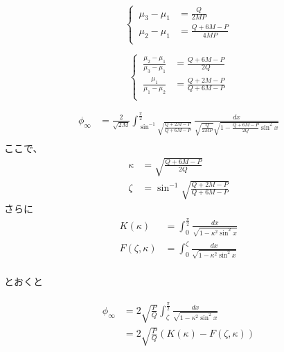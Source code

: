 \documentclass[dvipdfmx]{report} %
\begin{document}
\begin{equation}
\left\{ \,
\begin{aligned}
	\mu_3 - \mu_1 &= \frac{Q}{2MP}\\
	\mu_2 - \mu_1 &= \frac{Q + 6M - P}{4MP}\\
\end{aligned}
\right.
\end{equation}

\begin{equation}
\left\{ \,
\begin{aligned}
	\frac{\mu_2 - \mu_1}{\mu_3 - \mu_1} &= \frac{Q + 6M - P}{2Q}\\
	\frac{\mu_1}{\mu_1 - \mu_2} &= \frac{Q + 2M - P}{Q + 6M - P}\\
\end{aligned}
\right.
\end{equation}

\begin{equation*}
\begin{split}
	\phi_{\infty} &= \frac{2}{\sqrt{2M}} \int^{\frac{\pi}{2}}_{\sin^{-1}\sqrt{\frac{Q + 2M - P}{Q + 6M - P}}} \frac{ dx }{\sqrt{\frac{Q}{2MP}} \sqrt{ 1 - \frac{Q + 6M - P}{2Q} \sin^2 x }}\\
\end{split}
\end{equation*}
ここで、
\begin{equation*}
\begin{split}
	\kappa &= \sqrt{ \frac{Q+6M-P}{2Q} }\\
	\zeta &= \sin^{-1} \sqrt{\frac{Q+2M-P}{Q+6M-P}}
\end{split}
\end{equation*}
さらに
\begin{equation*}
\begin{split}
	K(\kappa) &= \int^{\frac{\pi}{2}}_{0} \frac{ dx }{\sqrt{ 1 - \kappa^2 \sin^2 x }}\\
	F(\zeta, \kappa) &= \int^{\zeta}_{0} \frac{ dx }{\sqrt{ 1 - \kappa^2 \sin^2 x }}\\
\end{split}
\end{equation*}

とおくと
\begin{tcolorbox}[title=$\phi_{\infty}$についての式]
\begin{eqnarray*}
\begin{split}
	\phi_{\infty} &= 2\sqrt{ \frac{P}{Q} } \int^{\frac{\pi}{2}}_{\zeta} \frac{ dx }{\sqrt{ 1 - \kappa^2 \sin^2 x }}\\
	&= 2\sqrt{ \frac{P}{Q} }\left( K(\kappa) - F(\zeta, \kappa) \right)
\end{split}
\end{eqnarray*}
\end{tcolorbox}
\end{document}
